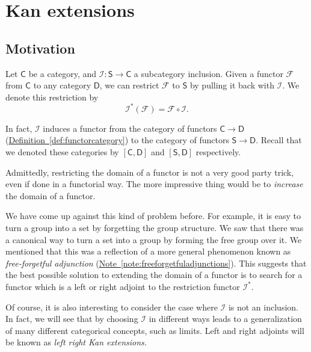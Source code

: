 \documentclass[notes.tex]{subfiles}
\begin{document}
\chapter{Kan extensions}
\label{sec:kan_extensions}

\section{Motivation}
\label{sec:motivation}

Let $\mathsf{C}$ be a category, and $\mathcal{I}\colon \mathsf{S} \to \mathsf{C}$ a subcategory inclusion. Given a functor $\mathcal{F}$ from $\mathsf{C}$ to any category $\mathsf{D}$, we can restrict $\mathcal{F}$ to $\mathsf{S}$ by pulling it back with $\mathcal{I}$. We denote this restriction by
\begin{equation*}
  \mathcal{I}^{*}(\mathcal{F}) = \mathcal{F} \circ \mathcal{I}.
\end{equation*}

In fact, $\mathcal{I}$ induces a functor from the category of functors $\mathsf{C} \to \mathsf{D}$ (\hyperref[def:functorcategory]{Definition~\ref*{def:functorcategory}}) to the category of functors $\mathsf{S} \to \mathsf{D}$. Recall that we denoted these categories by $[\mathsf{C}, \mathsf{D}]$ and $[\mathsf{S}, \mathsf{D}]$ respectively.

Admittedly, restricting the domain of a functor is not a very good party trick, even if done in a functorial way. The more impressive thing would be to \emph{increase} the domain of a functor.

We have come up against this kind of problem before. For example, it is easy to turn a group into a set by forgetting the group structure. We saw that there was a canonical way to turn a set into a group by forming the free group over it. We mentioned that this was a reflection of a more general phenomenon known as \emph{free-forgetful adjunction} (\hyperref[note:freeforgetfuladjunctions]{Note~\ref*{note:freeforgetfuladjunctions}}). This suggests that the best possible solution to extending the domain of a functor is to search for a functor which is a left or right adjoint to the restriction functor $\mathcal{I}^{*}$.

Of course, it is also interesting to consider the case where $\mathcal{I}$ is not an inclusion. In fact, we will see that by choosing $\mathcal{I}$ in different ways leads to a generalization of many different categorical concepts, such as limits. Left and right adjoints will be known as \emph{left right Kan extensions.}
\end{document}
